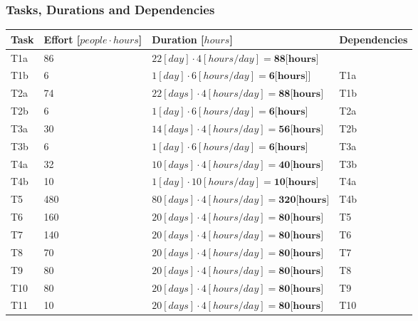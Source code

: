 \subsubsection{Tasks, Durations and Dependencies}
\lipsum[100]
\begin{center}
	\begin{tabulary}{\linewidth\tymin=70pt}{Y{1cm}|Y{2.5cm}|Y{4cm}|Y{2.5cm}}
		\textbf{Task} & \textbf{Effort [$people \cdot hours$]} & \textbf{Duration [$hours$]} & \textbf{Dependencies} \\ \hline
		T1a &  86 & $22[day] \cdot 4[hours/day] = \textbf{88[hours]}$  & \\ \hline
		T1b & 6 & $1[day] \cdot 6[hours/day] = \textbf{6[hours]}$] & T1a \\ \hline
		T2a & 74 & $22[days] \cdot 4[hours/day] = \textbf{88[hours]}$ & T1b \\ \hline
		T2b & 6 & $1[day] \cdot 6[hours/day] = \textbf{6[hours]}$ & T2a \\ \hline
		T3a & 30 & $14[days] \cdot 4[hours/day] = \textbf{56[hours]}$ & T2b \\ \hline
		T3b & 6 & $1[day] \cdot 6[hours/day] = \textbf{6[hours]}$ & T3a \\ \hline
		T4a & 32 & $10[days] \cdot 4[hours/day] = \textbf{40[hours]}$ & T3b \\ \hline
		T4b & 10 & $1[day] \cdot 10[hours/day] = \textbf{10[hours]}$ & T4a \\ \hline
		T5 & 480 & $80[days] \cdot 4[hours/day] = \textbf{320[hours]}$ & T4b \\ \hline
		T6 & 160 & $20[days] \cdot 4[hours/day] = \textbf{80[hours]}$ & T5 \\ \hline
		T7 & 140 & $20[days] \cdot 4[hours/day] = \textbf{80[hours]}$ & T6 \\ \hline
		T8 & 70 & $20[days] \cdot 4[hours/day] = \textbf{80[hours]}$ & T7 \\ \hline
		T9 & 80 & $20[days] \cdot 4[hours/day] = \textbf{80[hours]}$ & T8 \\ \hline
		T10 & 80 & $20[days] \cdot 4[hours/day] = \textbf{80[hours]}$ & T9 \\ \hline
		T11 & 10 & $20[days] \cdot 4[hours/day] = \textbf{80[hours]}$ & T10 \\ \hline
	\end{tabulary}
\end{center}
%
